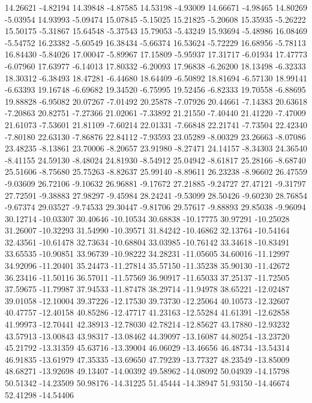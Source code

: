 {14.26621 -4.82194
14.39848 -4.87585
14.53198 -4.93009
14.66671 -4.98465
14.80269 -5.03954
14.93993 -5.09474
15.07845 -5.15025
15.21825 -5.20608
15.35935 -5.26222
15.50175 -5.31867
15.64548 -5.37543
15.79053 -5.43249
15.93694 -5.48986
16.08469 -5.54752
16.23382 -5.60549
16.38434 -5.66374
16.53624 -5.72229
16.68956 -5.78113
16.84430 -5.84026
17.00047 -5.89967
17.15809 -5.95937
17.31717 -6.01934
17.47773 -6.07960
17.63977 -6.14013
17.80332 -6.20093
17.96838 -6.26200
18.13498 -6.32333
18.30312 -6.38493
18.47281 -6.44680
18.64409 -6.50892
18.81694 -6.57130
18.99141 -6.63393
19.16748 -6.69682
19.34520 -6.75995
19.52456 -6.82333
19.70558 -6.88695
19.88828 -6.95082
20.07267 -7.01492
20.25878 -7.07926
20.44661 -7.14383
20.63618 -7.20863
20.82751 -7.27366
21.02061 -7.33892
21.21550 -7.40440
21.41220 -7.47009
21.61073 -7.53601
21.81109 -7.60214
22.01331 -7.66848
22.21741 -7.73504
22.42340 -7.80180
22.63130 -7.86876
22.84112 -7.93593
23.05289 -8.00329
23.26663 -8.07086
23.48235 -8.13861
23.70006 -8.20657
23.91980 -8.27471
24.14157 -8.34303
24.36540 -8.41155
24.59130 -8.48024
24.81930 -8.54912
25.04942 -8.61817
25.28166 -8.68740
25.51606 -8.75680
25.75263 -8.82637
25.99140 -8.89611
26.23238 -8.96602
26.47559 -9.03609
26.72106 -9.10632
26.96881 -9.17672
27.21885 -9.24727
27.47121 -9.31797
27.72591 -9.38883
27.98297 -9.45984
28.24241 -9.53099
28.50426 -9.60230
28.76854 -9.67374
29.03527 -9.74533
29.30447 -9.81706
29.57617 -9.88893
29.85038 -9.96094
30.12714 -10.03307
30.40646 -10.10534
30.68838 -10.17775
30.97291 -10.25028
31.26007 -10.32293
31.54990 -10.39571
31.84242 -10.46862
32.13764 -10.54164
32.43561 -10.61478
32.73634 -10.68804
33.03985 -10.76142
33.34618 -10.83491
33.65535 -10.90851
33.96739 -10.98222
34.28231 -11.05605
34.60016 -11.12997
34.92096 -11.20401
35.24473 -11.27814
35.57150 -11.35238
35.90130 -11.42672
36.23416 -11.50116
36.57011 -11.57569
36.90917 -11.65033
37.25137 -11.72505
37.59675 -11.79987
37.94533 -11.87478
38.29714 -11.94978
38.65221 -12.02487
39.01058 -12.10004
39.37226 -12.17530
39.73730 -12.25064
40.10573 -12.32607
40.47757 -12.40158
40.85286 -12.47717
41.23163 -12.55284
41.61391 -12.62858
41.99973 -12.70441
42.38913 -12.78030
42.78214 -12.85627
43.17880 -12.93232
43.57913 -13.00843
43.98317 -13.08462
44.39097 -13.16087
44.80254 -13.23720
45.21792 -13.31359
45.63716 -13.39004
46.06029 -13.46656
46.48734 -13.54314
46.91835 -13.61979
47.35335 -13.69650
47.79239 -13.77327
48.23549 -13.85009
48.68271 -13.92698
49.13407 -14.00392
49.58962 -14.08092
50.04939 -14.15798
50.51342 -14.23509
50.98176 -14.31225
51.45444 -14.38947
51.93150 -14.46674
52.41298 -14.54406
}

